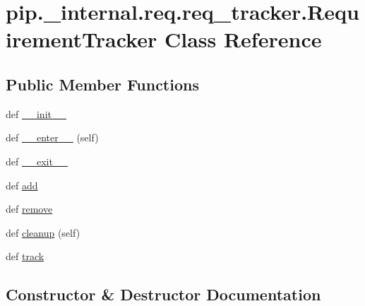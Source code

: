 \hypertarget{classpip_1_1__internal_1_1req_1_1req__tracker_1_1RequirementTracker}{}\section{pip.\+\_\+internal.\+req.\+req\+\_\+tracker.\+Requirement\+Tracker Class Reference}
\label{classpip_1_1__internal_1_1req_1_1req__tracker_1_1RequirementTracker}
\subsection*{Public Member Functions}
\begin{DoxyCompactItemize}
\item 
def \hyperlink{classpip_1_1__internal_1_1req_1_1req__tracker_1_1RequirementTracker_a5a44c98028fc9f8ff7b7f8776bf10b32}{\+\_\+\+\_\+init\+\_\+\+\_\+}
\item 
def \hyperlink{classpip_1_1__internal_1_1req_1_1req__tracker_1_1RequirementTracker_aa9bb5b97f48e8fadc81db0c2ac6c5978}{\+\_\+\+\_\+enter\+\_\+\+\_\+} (self)
\item 
def \hyperlink{classpip_1_1__internal_1_1req_1_1req__tracker_1_1RequirementTracker_a069c199625d80496f8634086209afe64}{\+\_\+\+\_\+exit\+\_\+\+\_\+}
\item 
def \hyperlink{classpip_1_1__internal_1_1req_1_1req__tracker_1_1RequirementTracker_aeabc0046aa5d32f329c3f56dead80927}{add}
\item 
def \hyperlink{classpip_1_1__internal_1_1req_1_1req__tracker_1_1RequirementTracker_af8928d7331c8b88fd8717ac6782a6eca}{remove}
\item 
def \hyperlink{classpip_1_1__internal_1_1req_1_1req__tracker_1_1RequirementTracker_a41511e9dcce2238073ab9560e539eb99}{cleanup} (self)
\item 
def \hyperlink{classpip_1_1__internal_1_1req_1_1req__tracker_1_1RequirementTracker_a65bf18342e1f8a2e63eb47ceed96896a}{track}
\end{DoxyCompactItemize}


\subsection{Constructor \& Destructor Documentation}
\mbox{\label{classpip_1_1__internal_1_1req_1_1req__tracker_1_1RequirementTracker_a5a44c98028fc9f8ff7b7f8776bf10b32}} 
